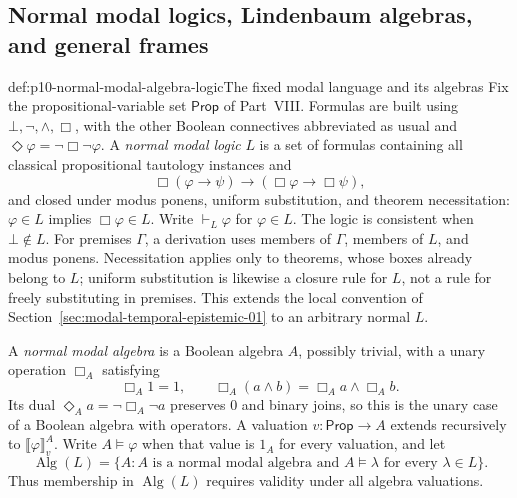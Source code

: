 
\subsection{Normal modal logics, Lindenbaum algebras, and general frames}
\label{sec:p10-modal-algebra-completeness}

\begin{hbdefinition}{def:p10-normal-modal-algebra-logic}{The fixed modal language and its algebras}
Fix the propositional-variable set \(\mathsf{Prop}\) of Part~VIII.
Formulas are built using \(\bot,\neg,\wedge,\Box\), with the other
Boolean connectives abbreviated as usual and
\(\Diamond\varphi=\neg\Box\neg\varphi\).
A \emph{normal modal logic} \(L\) is a set of formulas containing
all classical propositional tautology instances and
\[
 \Box(\varphi\to\psi)\to(\Box\varphi\to\Box\psi),
\]
and closed under modus ponens, uniform substitution, and
theorem necessitation: \(\varphi\in L\) implies \(\Box\varphi\in L\).
Write \(\vdash_L\varphi\) for \(\varphi\in L\).
The logic is consistent when \(\bot\notin L\).
For premises \(\Gamma\), a derivation uses members of \(\Gamma\),
members of \(L\), and modus ponens.  Necessitation applies only
to theorems, whose boxes already belong to \(L\); uniform
substitution is likewise a closure rule for \(L\), not a rule
for freely substituting in premises.
This extends the local convention of
Section~\ref{sec:modal-temporal-epistemic-01} to an arbitrary normal \(L\).

A \emph{normal modal algebra} is a Boolean algebra \(A\), possibly
trivial, with a unary operation \(\Box_A\) satisfying
\[
 \Box_A1=1,\qquad
 \Box_A(a\wedge b)=\Box_Aa\wedge\Box_Ab.
\]
Its dual \(\Diamond_Aa=\neg\Box_A\neg a\) preserves \(0\) and
binary joins, so this is the unary case of a Boolean algebra
with operators.
A valuation \(v:\mathsf{Prop}\to A\) extends recursively to
\(\llbracket\varphi\rrbracket_v^A\).
Write \(A\models\varphi\) when that value is \(1_A\) for every
valuation, and let
\[
 \operatorname{Alg}(L)
   =\{A:A\text{ is a normal modal algebra and }
                   A\models\lambda\text{ for every }\lambda\in L\}.
\]
Thus membership in \(\operatorname{Alg}(L)\) requires validity
under all algebra valuations.
\end{hbdefinition}

